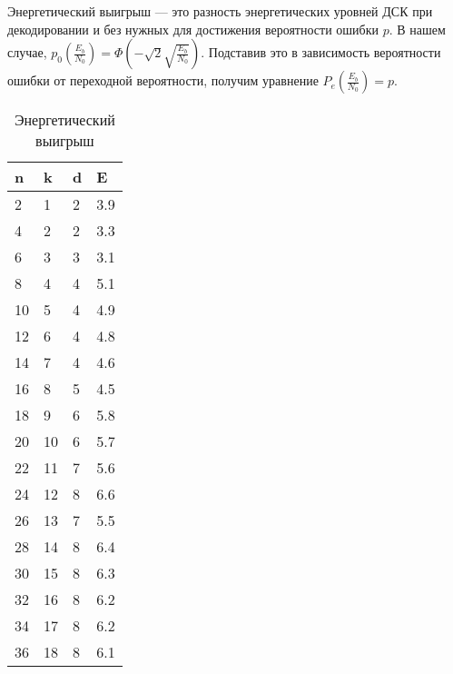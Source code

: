 \documentclass{article}
\begin{document}
%
Энергетический выигрыш {---} это разность энергетических уровней ДСК при декодировании и без нужных для достижения вероятности ошибки $p$. В нашем случае, $p_{0}(\frac{E_{b}}{N_{0}})=\Phi(-\sqrt{2}\sqrt{\frac{E_{b}}{N_{0}}})$. Подставив это в зависимость вероятности ошибки от переходной вероятности, получим уравнение $P_{e}(\frac{E_{b}}{N_{0}})=p$.
\begin{table}[]
\centering
\caption{Энергетический выигрыш}
\begin{tabular}{|l|l|l|l|}
\hline
n  & k  & d & E   \\ \hline
2  & 1  & 2 & 3.9 \\ \hline
4  & 2  & 2 & 3.3 \\ \hline
6  & 3  & 3 & 3.1 \\ \hline
8  & 4  & 4 & 5.1 \\ \hline
10 & 5  & 4 & 4.9 \\ \hline
12 & 6  & 4 & 4.8 \\ \hline
14 & 7  & 4 & 4.6 \\ \hline
16 & 8  & 5 & 4.5 \\ \hline
18 & 9  & 6 & 5.8 \\ \hline
20 & 10 & 6 & 5.7 \\ \hline
22 & 11 & 7 & 5.6 \\ \hline
24 & 12 & 8 & 6.6 \\ \hline
26 & 13 & 7 & 5.5 \\ \hline
28 & 14 & 8 & 6.4 \\ \hline
30 & 15 & 8 & 6.3 \\ \hline
32 & 16 & 8 & 6.2 \\ \hline
34 & 17 & 8 & 6.2 \\ \hline
36 & 18 & 8 & 6.1 \\ \hline
\end{tabular}
\end{table}
\end{document}
